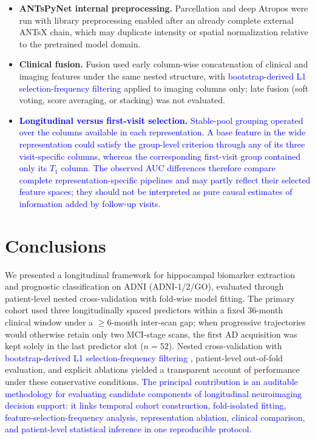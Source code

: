 \documentclass[review]{elsarticle}
\newcommand{\corrigir}[2]{%
	\textcolor{red}{\sout{#1}} %
	\textcolor{blue}{#2}%
}
\begin{document}
\begin{itemize}
		\item \textbf{ANTsPyNet internal preprocessing.} Parcellation and deep Atropos were run with library preprocessing enabled after an already complete external ANTsX chain, which may duplicate intensity or spatial normalization relative to the pretrained model domain.
		\item \textbf{Clinical fusion.} Fusion used early column-wise concatenation of clinical and imaging features under the same nested structure, with \corrigir{}{bootstrap-derived L1 selection-frequency filtering} applied to imaging columns only; late fusion (soft voting, score averaging, or stacking) was not evaluated.
		\item \corrigir{}{\textbf{Longitudinal versus first-visit selection.} Stable-pool grouping operated over the columns available in each representation. A base feature in the wide representation could satisfy the group-level criterion through any of its three visit-specific columns, whereas the corresponding first-visit group contained only its $T_1$ column. The observed AUC differences therefore compare complete representation-specific pipelines and may partly reflect their selected feature spaces; they should not be interpreted as pure causal estimates of information added by follow-up visits.}
	\end{itemize}
	
	\section{Conclusions}
	\label{sec:Conclusions}
	
	We presented a longitudinal framework for hippocampal biomarker extraction and prognostic classification on ADNI (ADNI-1/2/GO), evaluated through patient-level nested cross-validation with fold-wise model fitting. The primary cohort used three longitudinally spaced predictors within a fixed 36-month clinical window under a $\geq6$-month inter-scan gap; when progressive trajectories would otherwise retain only two MCI-stage scans, the first AD acquisition was kept solely in the last predictor slot ($n=52$). Nested cross-validation with \corrigir{}{bootstrap-derived L1 selection-frequency filtering}, patient-level out-of-fold evaluation, and explicit ablations yielded a transparent account of performance under these conservative conditions. \corrigir{}{The principal contribution is an auditable methodology for evaluating candidate components of longitudinal neuroimaging decision support: it links temporal cohort construction, fold-isolated fitting, feature-selection-frequency analysis, representation ablation, clinical comparison, and patient-level statistical inference in one reproducible protocol.}
	
\end{document}
